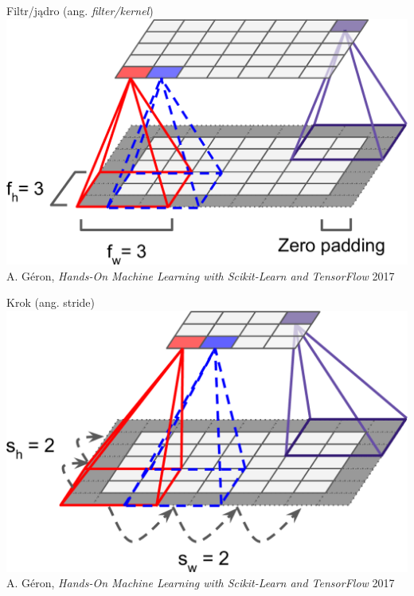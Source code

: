 \documentclass{sa}
\begin{document}
\begin{frame}{Filtr/jądro (ang. \emph{filter/kernel})}
\includegraphics[width=\textwidth]{mlst_1303.png}
{\vfill\footnotesize A. Géron, \emph{Hands-On Machine Learning with Scikit-Learn and TensorFlow} 2017}
\end{frame}

\begin{frame}{Krok (ang. stride)}
\includegraphics[width=\textwidth]{mlst_1304.png}
{\vfill\footnotesize A. Géron, \emph{Hands-On Machine Learning with Scikit-Learn and TensorFlow} 2017}
\end{frame}
\end{document}
